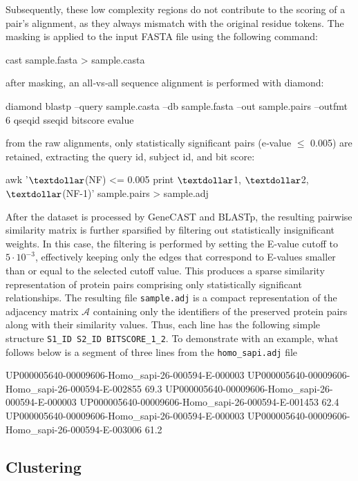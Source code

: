 Subsequently, these low complexity regions do not contribute to the scoring of
a pair's alignment, as they always mismatch with the original residue tokens.
The masking is applied to the input FASTA file using the following command:
\begin{plaintext}[numbers=none]
cast sample.fasta > sample.casta
\end{plaintext}
after masking, an all‑vs‑all sequence alignment is performed with diamond:
\begin{plaintext}
diamond blastp --query sample.casta --db sample.fasta --out sample.pairs --outfmt 6 qseqid sseqid bitscore evalue
\end{plaintext}
from the raw alignments, only statistically significant pairs (e‑value \(\leq\) 0.005) are retained, extracting the query id, subject id, and bit score:
\begin{plaintext}[numbers=none]
awk '$\textdollar$(NF) <= 0.005 {print $\textdollar$1, $\textdollar$2, $\textdollar$(NF-1)}' sample.pairs > sample.adj
\end{plaintext}
After the dataset is processed by GeneCAST and BLASTp, the resulting pairwise
similarity matrix is further sparsified by filtering out statistically
insignificant weights. In this case, the filtering is performed by setting the
E-value cutoff to \(5 \cdot 10^{-3}\), effectively keeping only the edges that
correspond to E-values smaller than or equal to the selected cutoff value. This
produces a sparse similarity representation of protein pairs comprising only
statistically significant relationships. The resulting file \texttt{sample.adj}
is a compact representation of the adjacency matrix \(\mathcal{A}\) containing
only the identifiers of the preserved protein pairs along with their similarity
values. Thus, each line has the following simple structure \texttt{S1\_ID
S2\_ID BITSCORE\_1\_2}. To demonstrate with an example, what follows below is
a segment of three lines from the \texttt{homo\_sapi.adj} file
\begin{plaintext}
UP000005640-00009606-Homo_sapi-26-000594-E-000003 UP000005640-00009606-Homo_sapi-26-000594-E-002855 69.3
UP000005640-00009606-Homo_sapi-26-000594-E-000003 UP000005640-00009606-Homo_sapi-26-000594-E-001453 62.4
UP000005640-00009606-Homo_sapi-26-000594-E-000003 UP000005640-00009606-Homo_sapi-26-000594-E-003006 61.2
\end{plaintext}

\subsection{Clustering}

